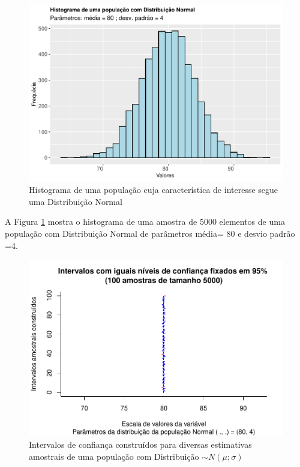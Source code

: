 \documentclass[
]{book}
\begin{document}
\begin{figure}

{\centering \includegraphics[width=1\linewidth]{apostila_files/figure-latex/fig49-1} 

}

\caption{Histograma de uma população cuja característica de interesse segue uma Distribuição Normal}\label{fig:fig49}
\end{figure}

\hfill\break

A Figura \ref{fig:fig49} mostra o histograma de uma amostra de 5000 elementos de uma população com Distribuição Normal de parâmetros média= 80 e desvio padrão =4.

\hfill\break

\begin{figure}

{\centering \includegraphics[width=1\linewidth]{apostila_files/figure-latex/fig50-1} 

}

\caption{Intervalos de confiança construídos para diversas estimativas amostrais de uma população com Distribuição $\sim N (\mu; \sigma)$}\label{fig:fig50}
\end{figure}
\end{document}
